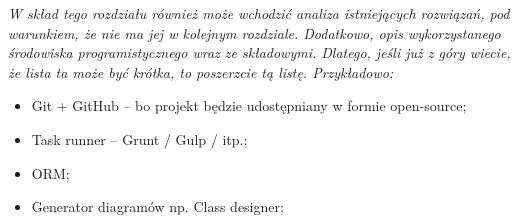 \textit{W skład tego rozdziału również może wchodzić analiza istniejących rozwiązań, pod warunkiem, że nie ma jej w kolejnym rozdziale. Dodatkowo, opis wykorzystanego środowiska programistycznego wraz ze składowymi. Dlatego, jeśli już z góry wiecie, że lista ta może być krótka, to poszerzcie tą listę. Przykładowo:}

\begin{itemize}
    \item Git + GitHub – bo projekt będzie udostępniany w formie open-source;
    \item Task runner – Grunt / Gulp / itp.;
    \item ORM;
    \item Generator diagramów np. Class designer;
\end{itemize}